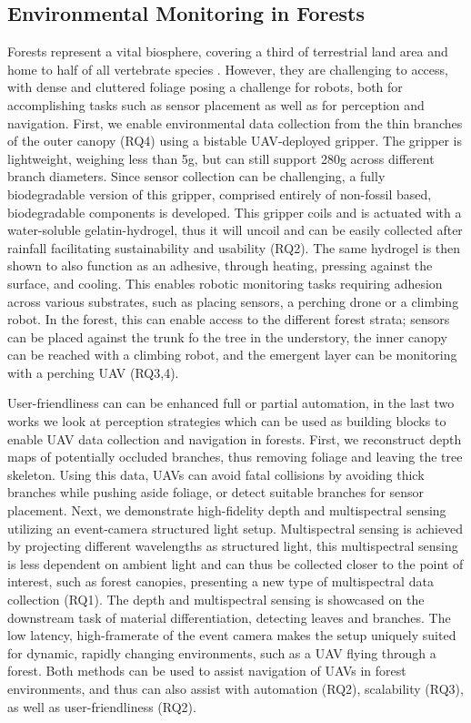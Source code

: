 \subsection{Environmental Monitoring in Forests}
Forests represent a vital biosphere, covering a third of terrestrial land area \cite{FAO2020a} and home to half of all vertebrate species \cite{Pillay2022}.
However, they are challenging to access, with dense and cluttered foliage posing a challenge for robots, both for accomplishing tasks such as sensor placement as well as for perception and navigation. First, we enable environmental data collection from the thin branches of the outer canopy (RQ4) using a bistable UAV-deployed gripper. The gripper is lightweight, weighing less than 5g, but can still support 280g across different branch diameters. Since sensor collection can be challenging, a fully biodegradable version of this gripper, comprised entirely of non-fossil based, biodegradable components is developed. This gripper coils and is actuated with a water-soluble gelatin-hydrogel, thus it will uncoil and can be easily collected after rainfall facilitating sustainability and usability (RQ2). The same hydrogel is then shown to also function as an adhesive, through heating, pressing against the surface, and cooling. This enables robotic monitoring tasks requiring adhesion across various substrates, such as placing sensors, a perching drone or a climbing robot. In the forest, this can enable access to the different forest strata; sensors can be placed against the trunk fo the tree in the understory, the inner canopy can be reached with a climbing robot, and the emergent layer can be monitoring with a perching UAV (RQ3,4).

User-friendliness can can be enhanced full or partial automation, in the last two works we look at perception strategies which can be used as building blocks to enable UAV data collection and navigation in forests. First, we reconstruct depth maps of potentially occluded branches, thus removing foliage and leaving the tree skeleton. Using this data, UAVs can avoid fatal collisions by avoiding thick branches while pushing aside foliage, or detect suitable branches for sensor placement. Next, we demonstrate high-fidelity depth and multispectral sensing utilizing an event-camera structured light setup. Multispectral sensing is achieved by projecting different wavelengths as structured light, this multispectral sensing is less dependent on ambient light and can thus be collected closer to the point of interest, such as forest canopies, presenting a new type of multispectral data collection (RQ1). The depth and multispectral sensing is showcased on the downstream task of material differentiation, detecting leaves and branches. The low latency, high-framerate of the event camera makes the setup uniquely suited for dynamic, rapidly changing environments, such as a UAV flying through a forest. Both methods can be used to assist navigation of UAVs in forest environments, and thus can also assist with automation (RQ2), scalability (RQ3), as well as user-friendliness (RQ2).

